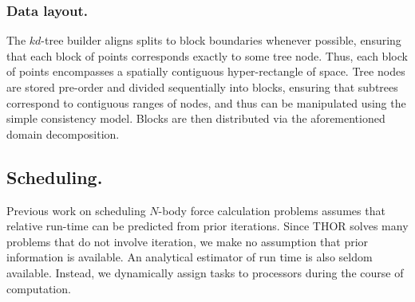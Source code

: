 \documentclass[twoside,leqno,twocolumn]{article}
\newcommand{\authornote}[1]{(\footnote{Note to self: #1})}
\newcommand{\authorsnote}[1]{\authornote{#1}}
\newcommand{\mysubsub}[1]{\subsubsection{#1.}}
\newcommand{\mysub}[1]{\subsection{#1.}}
\begin{document}


\mysubsub{Data layout}
The $kd$-tree builder aligns splits to block boundaries whenever possible, ensuring that each block of points corresponds exactly to some tree node.
Thus, each block of points encompasses a spatially contiguous hyper-rectangle of space.
Tree nodes are stored pre-order and divided sequentially into blocks, ensuring that subtrees correspond to contiguous ranges of nodes, and thus can be manipulated using the simple consistency model.
Blocks are then distributed via the aforementioned domain decomposition.

\mysub{Scheduling}
Previous work \cite{salmon_thesis, singh_thesis} on scheduling $N$-body force calculation problems assumes that relative run-time can be predicted from prior iterations.
Since THOR solves many problems that do not involve iteration, we make no assumption that prior information is available.
An analytical estimator of run time is also seldom available.
Instead, we dynamically assign tasks to processors during the course of computation.

\end{document}

